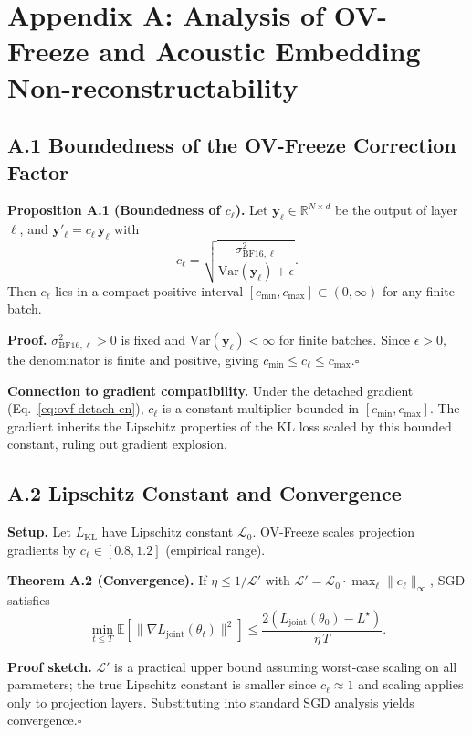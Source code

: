 \documentclass[lettersize,journal]{IEEEtran}
\begin{document}
\appendices
\section*{Appendix A: Analysis of OV-Freeze and Acoustic Embedding Non-reconstructability}
\label{app:ovf}

\subsection*{A.1 Boundedness of the OV-Freeze Correction Factor}

\noindent\textbf{Proposition A.1 (Boundedness of $c_\ell$).} Let $\bm{y}_\ell\in\mathbb{R}^{N\times d}$ be the output of layer $\ell$, and $\bm{y}'_\ell = c_\ell\,\bm{y}_\ell$ with
\[
c_\ell = \sqrt{\frac{\sigma^2_{\mathrm{BF16},\ell}}{\mathrm{Var}(\bm{y}_\ell)+\epsilon}}.
\]
Then $c_\ell$ lies in a compact positive interval $[c_{\min}, c_{\max}] \subset (0, \infty)$ for any finite batch.

\noindent\textbf{Proof.} $\sigma^2_{\mathrm{BF16},\ell}>0$ is fixed and $\mathrm{Var}(\bm{y}_\ell)<\infty$ for finite batches. Since $\epsilon>0$, the denominator is finite and positive, giving $c_{\min}\le c_\ell\le c_{\max}$.\hfill$\square$

\medskip
\noindent\textbf{Connection to gradient compatibility.} Under the detached gradient (Eq.~\eqref{eq:ovf-detach-en}), $c_\ell$ is a constant multiplier bounded in $[c_{\min}, c_{\max}]$. The gradient inherits the Lipschitz properties of the KL loss scaled by this bounded constant, ruling out gradient explosion.

\subsection*{A.2 Lipschitz Constant and Convergence}

\noindent\textbf{Setup.} Let $L_{\mathrm{KL}}$ have Lipschitz constant $\mathcal{L}_0$. OV-Freeze scales projection gradients by $c_\ell\in[0.8,1.2]$ (empirical range).

\noindent\textbf{Theorem A.2 (Convergence).} If $\eta\le 1/\mathcal{L}'$ with $\mathcal{L}' = \mathcal{L}_0\cdot\max_\ell\|c_\ell\|_\infty$, SGD satisfies
\[
\min_{t\le T}\mathbb{E}[\|\nabla L_{\mathrm{joint}}(\theta_t)\|^2] \le \frac{2(L_{\mathrm{joint}}(\theta_0) - L^\star)}{\eta\,T}.
\]

\noindent\textbf{Proof sketch.} $\mathcal{L}'$ is a practical upper bound assuming worst-case scaling on all parameters; the true Lipschitz constant is smaller since $c_\ell\approx 1$ and scaling applies only to projection layers. Substituting into standard SGD analysis yields convergence.\hfill$\square$
\end{document}
